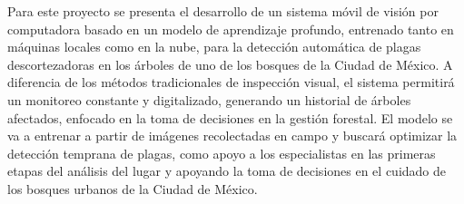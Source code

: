 Para este proyecto se presenta el desarrollo de un sistema móvil de visión por computadora basado en un modelo de aprendizaje profundo, entrenado tanto en máquinas locales como en la nube, para la detección automática de plagas descortezadoras en los árboles de uno de los bosques de la Ciudad de México. A diferencia de los métodos tradicionales de inspección visual, el sistema permitirá un monitoreo constante y digitalizado, generando un historial de árboles afectados, enfocado en la toma de decisiones en la gestión forestal. El modelo se va a entrenar a partir de imágenes recolectadas en campo y buscará optimizar la detección temprana de plagas, como apoyo a los especialistas en las primeras etapas del análisis del lugar y apoyando la toma de decisiones en el cuidado de los bosques urbanos de la Ciudad de México.